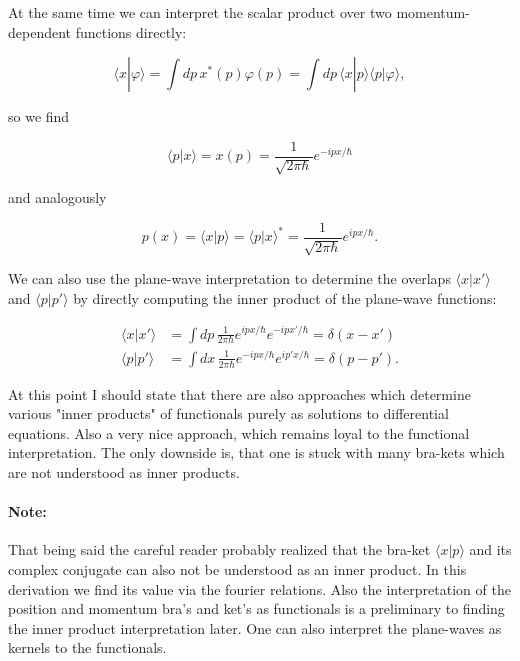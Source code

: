 At the same time we can interpret the scalar product over two
momentum-dependent functions directly:

\begin{equation}
\langle x|\varphi\rangle = \int dp\,x^*(p)\varphi(p) = \int dp\,\langle x|p\rangle\langle p|\varphi\rangle,
\end{equation}

so we find

\begin{equation}
\langle p|x\rangle = x(p) = \frac{1}{\sqrt{2\pi\hbar}}e^{-ipx/\hbar}
\end{equation}

and analogously

\begin{equation}
p(x) = \langle x|p\rangle = \langle p|x\rangle^* = \frac{1}{\sqrt{2\pi\hbar}}e^{ipx/\hbar}.
\end{equation}

We can also use the plane-wave interpretation to determine the
overlaps $\langle x|x'\rangle$ and $\langle p|p'\rangle$ by directly
computing the inner product of the plane-wave functions:

\begin{align}
\langle x|x'\rangle &= \int dp\,\frac{1}{2\pi\hbar}e^{ipx/\hbar}e^{-ipx'/\hbar} = \delta(x-x')\\
\langle p|p'\rangle &= \int dx\,\frac{1}{2\pi\hbar}e^{-ipx/\hbar}e^{ip'x/\hbar} = \delta(p-p').
\end{align}

At this point I should state that there are also approaches \cite{Madrid_2005}
which determine various "inner products" of functionals purely as
solutions to differential equations. Also a very nice approach, which remains loyal to the functional interpretation.
The only downside is, that one is stuck with many bra-kets which are not understood as inner products.
\paragraph{Note:}
That being said the careful reader probably realized that the bra-ket $\langle x|p\rangle$ and its complex conjugate
can also not be understood as an inner product. In this derivation we find its value via the fourier relations. Also 
the interpretation of the position and momentum bra's and ket's as functionals is a preliminary to finding the inner product 
interpretation later. One can also interpret the plane-waves as kernels to the functionals.

